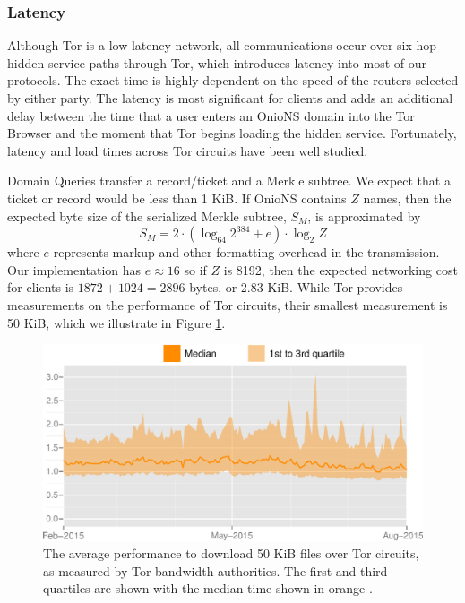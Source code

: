 \documentclass[USenglish,oneside,twocolumn]{article}
\begin{document}
\subsubsection{Latency}

Although Tor is a low-latency network, all communications occur over six-hop hidden service paths through Tor, which introduces latency into most of our protocols. The exact time is highly dependent on the speed of the routers selected by either party. The latency is most significant for clients and adds an additional delay between the time that a user enters an OnioNS domain into the Tor Browser and the moment that Tor begins loading the hidden service. Fortunately, latency and load times across Tor circuits have been well studied. 

Domain Queries transfer a record/ticket and a Merkle subtree. We expect that a ticket or record would be less than 1 KiB. If OnioNS contains $ Z $ names, then the expected byte size of the serialized Merkle subtree, $ S_{M} $, is approximated by
\[
S_{M} = 2 \cdot (\log_{64} 2^{384} + e) \cdot \log_{2} Z
\]
\noindent where $ e $ represents markup and other formatting overhead in the transmission. Our implementation has $ e \approx 16 $ so if $ Z $ is 8192, then the expected networking cost for clients is $ 1872 + 1024 = 2896 $ bytes, or 2.83 KiB. While Tor provides measurements on the performance of Tor circuits, their smallest measurement is 50 KiB, which we illustrate in Figure \ref{fig:latencyGraph}.

\begin{figure}[h]
	\centering
	\includegraphics[width=\linewidth]{../assets/images/torperf_50kb_2015-02_2015-08.eps}
	\caption{The average performance to download 50 KiB files over Tor circuits, as measured by Tor bandwidth authorities. The first and third quartiles are shown with the median time shown in orange \cite{TorMetrics}.}
	\label{fig:latencyGraph}
\end{figure}
\end{document}

